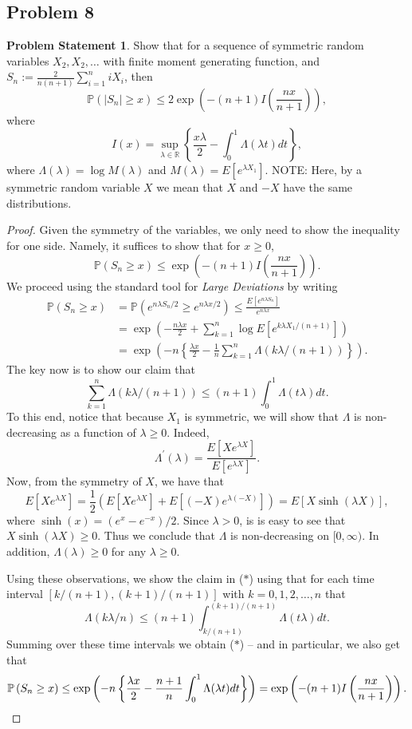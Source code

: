 \documentclass[12pt,reqno]{article}
\renewcommand{\emph}[1]{\textit{#1}}
\theoremstyle{plain}
\theoremstyle{definition}
\newtheorem{problem}[theorem]{Problem Statement}
\newcommand{\PP}[1]{\ensuremath{\mathbb{P}\left(#1\right)}}
\begin{document}
\subsection{Problem 8}

\begin{problem}
Show that for a sequence of symmetric random variables $X_2,X_2,\ldots$ 
with finite moment generating function, and 
$S_n := \frac{2}{n(n+1)} \sum_{i=1}^n iX_i$, then 
\[
\PP{|S_n| \geq x} \leq 2 \exp\left(-(n+1) I\left(\frac{nx}{n+1}\right)\right), 
\]
where 
\[
I(x) = \sup_{\lambda \in \mathbb{R}} \left\{\frac{x\lambda}{2} - 
     \int_0^1 \Lambda(\lambda t) dt\right\}, 
\]
where $\Lambda(\lambda) = \log M(\lambda)$ and 
$M(\lambda) = E[e^{\lambda X_1}]$. NOTE: Here, by a symmetric random variable 
$X$ we mean that $X$ and $-X$ have the same distributions.
\end{problem}
\begin{proof}
Given the symmetry of the variables, we only need to show the inequality for 
one side. Namely, it suffices to show that for $x \geq 0$, 
\[
\PP{S_n \geq x} \leq \exp\left(-(n+1) I\left(\frac{nx}{n+1}\right)\right). 
\]
We proceed using the standard tool for \emph{Large Deviations} by writing 
\begin{align*} 
\PP{S_n \geq x} & = \PP{e^{n\lambda S_n/2} \geq e^{n\lambda x/2}} \leq 
     \frac{E[e^{n\lambda S_n}]}{e^{n\lambda x}} \\ 
     & = \exp\left(-\frac{n\lambda x}{2} + \sum_{k=1}^n 
     \log E[e^{k\lambda X_1 / (n+1)}]\right) \\ 
     & = \exp\left(-n\left\{\frac{\lambda x}{2} - \frac{1}{n} 
     \sum_{k=1}^n \Lambda(k\lambda / (n+1))\right\}\right). 
\end{align*} 
The key now is to show our claim that 
\[
\tag{$\ast$} 
\sum_{k=1}^n \Lambda(k\lambda / (n+1)) \leq (n+1) \int_0^1 \Lambda(t\lambda) dt. 
\]
To this end, notice that because $X_1$ is symmetric, we will show that 
$\Lambda$ is non-decreasing as a function of $\lambda \geq 0$. Indeed, 
\[
\Lambda^{\prime}(\lambda) = \frac{E[X e^{\lambda X}]}{E[e^{\lambda X}]}. 
\]
Now, from the symmetry of $X$, we have that 
\[
E[Xe^{\lambda X}] = \frac{1}{2}\left(E[Xe^{\lambda X}] + 
     E[(-X)e^{\lambda(-X)}]\right) = E[X \sinh(\lambda X)], 
\]
where $\sinh(x) = (e^x-e^{-x}) / 2$. 
Since $\lambda > 0$, is is easy to see that $X \sinh(\lambda X) \geq 0$. 
Thus we conclude that $\Lambda$ is non-decreasing on $[0, \infty)$. In 
addition, $\Lambda(\lambda) \geq 0$ for any $\lambda \geq 0$. 

Using these observations, we show the claim in ($\ast$) using that for 
each time interval $[k/(n+1),(k+1)/(n+1)]$ with $k = 0,1,2,\ldots,n$ that 
\[
\Lambda(k\lambda / n) \leq (n+1) \int_{k/(n+1)}^{(k+1)/(n+1)} 
     \Lambda(t\lambda) dt. 
\]
Summing over these time intervals we obtain ($\ast$) -- and in particular, 
we also get that 
\[
     \PP{S_n \geq x} \leq \exp\left(-n\left\{\frac{\lambda x}{2} - 
     \frac{n+1}{n} \int_0^1 \Lambda(\lambda t) dt\right\}\right) = 
     \exp\left(-(n+1) I\left(\frac{nx}{n+1}\right)\right). 
     \qedhere 
\]
\end{proof}
\end{document}
